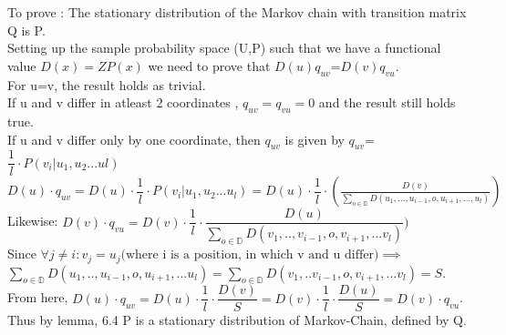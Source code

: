 To prove : The stationary distribution of the Markov chain with transition matrix Q is P.\\
Setting up the sample probability space (U,P) such that we have a functional value $D(x) =ZP(x)$ we need to prove that
$D(u)q_{uv}$=$D(v)q_{vu}$. \\
For u=v, the result holds as trivial. \\
If u and v differ in atleast 2 coordinates , $q_{uv} = q_{vu}=0$ and the result still holds true.\\
If u and v differ only by one coordinate, then $q_{uv}$ is given by  $q_{uv}$=  $  \dfrac{1}{l} \cdot P(v_{i} | u_{1}, u_{2}... u{l})$ \\
$D(u)\cdot q_{uv} = D(u)\cdot \dfrac{1}{l} \cdot P(v_{i} | u_{1}, u_{2}... u_{l} ) = 
 D(u)\cdot \dfrac{1}{l}\cdot \left(\frac{D(v)}{ \sum_{o \in \mathbb{D}} D(u_{1}, ..., u_{i-1}, o, u_{i+1}, ...,u_{l})}\right)$\\
 Likewise: $D(v)\cdot q_{vu} = D(v) \cdot \dfrac{1}{l} \cdot \dfrac{D(u)}{\sum_{o \in \mathbb{D}} D(v_{1}, .., v_{i-1}, o,v_{i+1}, ...v_{l})})$  \\
Since $\forall j \neq i: v_{j} = u_{j} \text{(where i is a position, in which v and u differ)}\implies$\\
$ \sum_{o \in \mathbb{D}} D(u_{1}, .., u_{i-1}, o, u_{i+1},...u_{l}) =  \sum_{o \in \mathbb{D}} D(v_{1}, ..v_{i-1}, o,v_{i+1},...v_{l}) = S$.\\
From here, $D(u) \cdot q_{uv} = D(u)\cdot  \dfrac{1}{l}\cdot  \dfrac{D(v)}{S} = D(v) \cdot \dfrac{1}{l} \cdot  \dfrac{D(u)}{S} = D(v)\cdot q_{vu}$.\\
Thus by lemma, 6.4 P is a stationary distribution of Markov-Chain, defined by Q.

